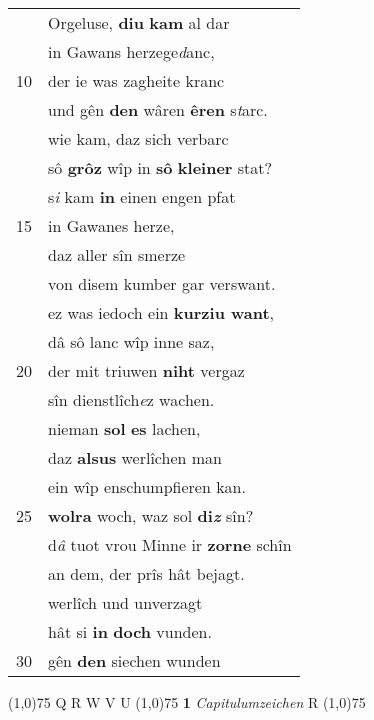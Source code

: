 \documentclass[8pt,a4paper,notitlepage]{article}
\begin{document}
\begin{table}[ht]
\begin{minipage}[t]{0.5\linewidth}
\begin{tabular}{rl}
 & Orgeluse, \textbf{diu} \textbf{kam} al dar\\ 
 & in Gawans herzege\textit{d}anc,\\ 
10 & der ie was zagheite kranc\\ 
 & und gên \textbf{den} wâren \textbf{êren} s\textit{t}arc.\\ 
 & wie kam, daz sich verbarc\\ 
 & sô \textbf{grôz} wîp in \textbf{sô} \textbf{kleiner} stat?\\ 
 & s\textit{i} kam \textbf{in} einen engen pfat\\ 
15 & in Gawanes herze,\\ 
 & daz aller sîn smerze\\ 
 & von disem kumber gar verswant.\\ 
 & ez was iedoch ein \textbf{kurziu want},\\ 
 & dâ sô lanc wîp inne saz,\\ 
20 & der mit triuwen \textbf{niht} vergaz\\ 
 & sîn dienstlîch\textit{e}z wachen.\\ 
 & nieman \textbf{sol} \textbf{es} lachen,\\ 
 & daz \textbf{alsus} werlîchen man\\ 
 & ein wîp enschumpfieren kan.\\ 
25 & \textbf{wolra} woch, waz sol \textbf{di\textit{z}} sîn?\\ 
 & d\textit{â} tuot vrou Minne ir \textbf{zorne} schîn\\ 
 & an dem, der prîs hât bejagt.\\ 
 & werlîch und unverzagt\\ 
 & hât si \textbf{in} \textbf{doch} vunden.\\ 
30 & gên \textbf{den} siechen wunden\\ 
\end{tabular}
\scriptsize
\line(1,0){75} \newline
Q R W V U \newline
\line(1,0){75} \newline
\textbf{1} \textit{Capitulumzeichen} R  \newline
\line(1,0){75} \newline

\end{minipage}
\end{table}
\end{document}
